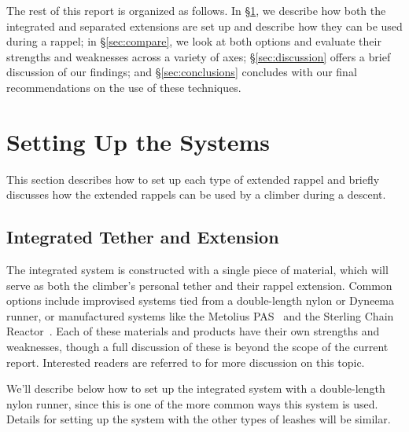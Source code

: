 \documentclass[nonacm,acmtog]{acmart}
\begin{document}
   The rest of this report is organized as follows.  In \S\ref{sec:setup}, we
   describe how both the integrated and separated extensions are set up and
   describe how they can be used during a rappel; in \S\ref{sec:compare}, we
   look at both options and evaluate their strengths and weaknesses across a
   variety of axes; \S\ref{sec:discussion} offers a brief discussion of our
   findings; and \S\ref{sec:conclusions} concludes with our final
   recommendations on the use of these techniques.


\section{Setting Up the Systems}
\label{sec:setup}

   This section describes how to set up each type of extended rappel and
   briefly discusses how the extended rappels can be used by a climber during a
   descent.

\subsection{Integrated Tether and Extension}

   The integrated system is constructed with a single piece of material, which
   will serve as both the climber's personal tether and their rappel extension.
   Common options include improvised systems tied from a double-length nylon or
   Dyneema runner, or manufactured systems like the Metolius
   PAS~\cite{gear:pas} and the Sterling Chain
   Reactor~\cite{gear:chain-reactor}.  Each of these materials and products
   have their own strengths and weaknesses, though a full discussion of these
   is beyond the scope of the current report.  Interested readers are referred
   to \cite{ctac:2019-1} for more discussion on this topic.

   We'll describe below how to set up the integrated system with a
   double-length nylon runner, since this is one of the more common ways this
   system is used.  Details for setting up the system with the other types of
   leashes will be similar.
\end{document}
